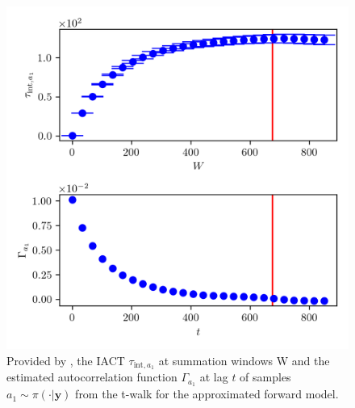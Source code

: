 \begin{figure}[ht!]
	\centering
	\includegraphics{UwerrTauIntTWalk7.png}
	\caption[IACT and autocorrelation function of samples $a_1 \sim \pi(\cdot|\bm{y})$, for approximated model.]{Provided by \cite{drikHesse}, the IACT $\tau_{\text{int},a_1}$ at summation windows W and the estimated autocorrelation function $\Gamma_{a_1}$ at lag $t$ of samples $a_1 \sim \pi( \cdot| \bm{y})$ from the t-walk for the approximated forward model.}
	\label{fig:TWalkIATC8}
\end{figure}


